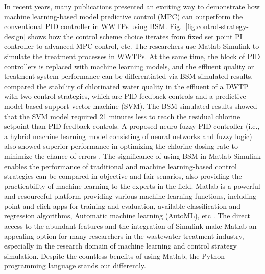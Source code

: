 In recent years, many publications presented an exciting way to demonstrate how machine learning-based model predictive control (MPC) can outperform the conventional PID controller in WWTPs using BSM. Fig.~\ref{fig:control-strategy-design} shows how the control scheme choice iterates from fixed set point PI controller to advanced MPC control, etc. The researchers use Matlab-Simulink to simulate the treatment processes in WWTPs. At the same time, the block of PID controllers is replaced with machine learning models, and the effluent quality or treatment system performance can be differentiated via BSM simulated results. \citet{wangModelPredictiveControl2020} compared the stability of chlorinated water quality in the effluent of a DWTP with two control strategies, which are PID feedback controls and a predictive model-based support vector machine (SVM). The BSM simulated results showed that the SVM model required 21 minutes less to reach the residual chlorine setpoint than PID feedback controls. A proposed neuro-fuzzy PID controller (i.e., a hybrid machine learning model consisting of neural networks and fuzzy logic) also showed superior performance in optimizing the chlorine dosing rate to minimize the chance of errors \citep{hongApplicationNeurofuzzyPID2012}. The significance of using BSM in Matlab-Simulink enables the performance of traditional and machine learning-based control strategies can be compared in objective and fair senarios, also providing the practicability of machine learning to the experts in the field. Matlab is a powerful and resourceful platform providing various machine learning functions, including point-and-click apps for training and evaluation, available classification and regression algorithms, Automatic machine learning (AutoML), etc \citep{mathworksMATLABMachineLearning2022}. The direct access to the abundant features and the integration of Simulink make Matlab an appealing option for many researchers in the wastewater treatment industry, especially in the research domain of machine learning and control strategy simulation. Despite the countless benefits of using Matlab, the Python programming language stands out differently.

